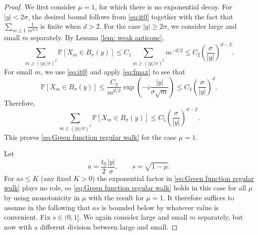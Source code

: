 \documentclass[11pt,a4paper]{article}
\numberwithin{equation}{section}
\theoremstyle{plain}
\theoremstyle{definition}
\newcommand\1{\mathds{1}}
\begin{document}
\begin{proof}
We first consider $\mu=1$, for which there is no exponential decay.
For  $|y|<2 \sigma$, the desired bound follows from \eqref{eq:it0} together with the fact
that $\sum_{m\geq 1}\tfrac{1}{m^{d/2}}$ is finite when $d>2$.
For the case $|y|\geq 2\sigma$,
we consider large and small $m$ separately.
By Lemma \ref{lem: weak anticonc},
\begin{equation}
	\sum_{m\geq (|y|/\sigma)^2}\mathbb P[X_m\in B_\sigma(y)]
	\leq
	C_1 \sum_{m\geq (|y|/\sigma)^2}m^{-d/2}	
	\leq
	C_2\left(\frac{\sigma}{|y|}\right)^{d-2}.
\end{equation}
For small $m$, we use
\eqref{eq:it0} and apply \eqref{eq:fmax}
to see that
\begin{equation}
	\mathbb P[X_m\in B_\sigma(y)]
    \leq \frac{C_3}{m^{d/2}}\exp\left(-c \frac{|y|}{ \sigma \sqrt{m}}\right)
    \leq C_4\left(\frac{\sigma}{|y|}\right)^d.
\end{equation}
Therefore,
\begin{equation}
	\sum_{ m \leq (|y|/\sigma)^2}\mathbb P[X_m\in B_\sigma(y)]\leq C_5 \left(\frac{\sigma}{|y|}\right)^{d-2}.
\end{equation}
This proves \eqref{eq:Green function regular walk} for the case $\mu=1$.

Let
\begin{equation}
    a = \frac{t_0}{2} \frac{|y|}{\sigma},
    \qquad
    s =\sqrt{1-\mu}.
\end{equation}
For $as \le K$ (any fixed $K>0$) the exponential factor in
\eqref{eq:Green function regular walk} plays no role,
so \eqref{eq:Green function regular walk} holds in this case for all $\mu$ by
using monotonicity in $\mu$ with the result for $\mu=1$.
It therefore suffices to assume in the following that
$as$ is bounded below by whatever value is
convenient.
Fix $s\in (0,1]$.
We again consider large and small $m$ separately, but
now with a different division between large and small.



\end{proof}
\end{document}
